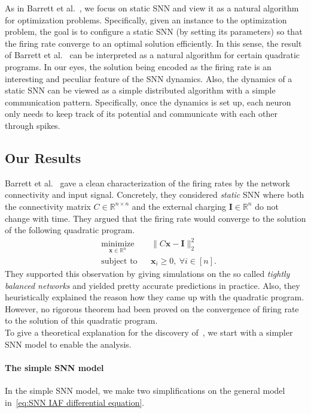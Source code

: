 \documentclass[11pt]{article}
\theoremstyle{remark}
\theoremstyle{definition}
\newcommand{\bx}{\mathbf{x}}
\newcommand{\bI}{\mathbf{I}}
\newcommand{\R}{{\mathbb R}} %
\begin{document}
As in Barrett et al.~\cite{barrett2013firing}, we focus on static SNN and view it as a natural algorithm for optimization problems. Specifically, given an instance to the optimization problem, the goal is to configure a static SNN (by setting its parameters) so that the firing rate converge to an optimal solution efficiently. In this sense, the result of Barrett et al.~\cite{barrett2013firing} can be interpreted as a natural algorithm for certain quadratic programs. In our eyes, the solution being encoded as the firing rate is an interesting and peculiar feature of the SNN dynamics. 
Also, the dynamics of a static SNN can be viewed as a simple distributed algorithm with a simple communication pattern. Specifically, once the dynamics is set up, each neuron only needs to keep track of its potential and communicate with each other through spikes.


\subsection{Our Results}

Barrett et al.~\cite{barrett2013firing} gave a clean characterization of the firing rates by the network connectivity and input signal. Concretely, they considered \textit{static} SNN where both the connectivity matrix $C\in\R^{n\times n}$ and the external charging $\bI\in\R^n$ do not change with time. They argued that the firing rate would converge to the solution of the following quadratic program.
\begin{equation}\label{op:quadratic program}
\begin{aligned}
& \underset{\bx\in\R^n}{\text{minimize}}
& & \|C\bx-\bI\|_2^2 \\
& \text{subject to}
& & \bx_i\geq0,\ \forall i\in[n].
\end{aligned}
\end{equation}
They supported this observation by giving simulations on the so called \textit{tightly balanced networks} and yielded pretty accurate predictions in practice. 
Also, they heuristically explained the reason how they came up with the quadratic program. 
However, no rigorous theorem had been proved on the convergence of firing rate to the solution of this quadratic program.\\

To give a theoretical explanation for the discovery of~\cite{barrett2013firing}, we start with a simpler SNN model to enable the analysis.

\paragraph{The simple SNN model}
In the simple SNN model, we make two simplifications on the general model in~\eqref{eq:SNN IAF differential equation}. 
\end{document}
